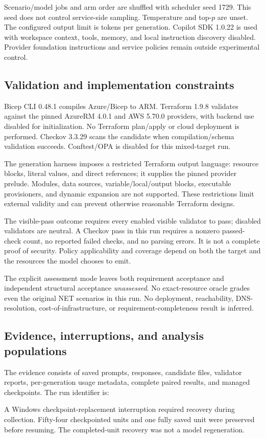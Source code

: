 \documentclass[11pt]{article}
\begin{document}
Scenario/model jobs and arm order are shuffled with scheduler seed 1729.
This seed does not control service-side sampling. Temperature and top-$p$ are
unset. The configured output limit is \OutputTokenBudget{} tokens per generation.
Copilot SDK 1.0.22 is used with workspace context, tools, memory, and local
instruction discovery disabled. Provider foundation instructions and service
policies remain outside experimental control.

\subsection{Validation and implementation constraints}
Bicep CLI 0.48.1 compiles Azure/Bicep to ARM. Terraform 1.9.8 validates against
the pinned AzureRM 4.0.1 and AWS 5.70.0 providers, with backend use disabled for
initialization. No Terraform plan/apply or cloud deployment is performed.
Checkov 3.3.29 scans the candidate when compilation/schema validation succeeds.
Conftest/OPA is disabled for this mixed-target run.

The generation harness imposes a restricted Terraform output language: resource
blocks, literal values, and direct references; it supplies the pinned provider
prelude. Modules, data sources, variable/local/output blocks, executable
provisioners, and dynamic expansion are not supported. These restrictions limit
external validity and can prevent otherwise reasonable Terraform designs.

The visible-pass outcome requires every enabled visible validator to pass;
disabled validators are neutral. A Checkov pass in this run requires a nonzero
passed-check count, no reported failed checks, and no parsing errors. It is not
a complete proof of security. Policy applicability and coverage depend on both
the target and the resources the model chooses to emit.

The explicit assessment mode leaves both requirement acceptance and independent
structural acceptance \emph{unassessed}. No exact-resource oracle grades even the
original NET scenarios in this run. No deployment, reachability, DNS-resolution,
cost-of-infrastructure, or requirement-completeness result is inferred.

\subsection{Evidence, interruptions, and analysis populations}
The evidence consists of saved prompts, responses, candidate files, validator
reports, per-generation usage metadata, complete paired results, and managed
checkpoints. The run identifier is:
\begin{center}\small\texttt{\StudyRun{}}\end{center}
A Windows checkpoint-replacement interruption required recovery during collection.
Fifty-four checkpointed units and one fully saved unit were preserved before
resuming. The completed-unit recovery was not a model regeneration.
\end{document}
